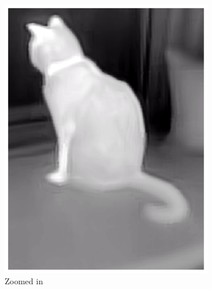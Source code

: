 \documentclass{l4proj}
\begin{document}
\begin{figure}[ht]
\begin{subfigure}[h!]{0.24\textwidth}
    \includegraphics[width=\textwidth]{images/augmentation/zoomed.png}
    \caption{Zoomed in}
  \end{subfigure}
  \begin{subfigure}[h!]{0.24\textwidth}

\end{subfigure}
\end{figure}
\end{document}
